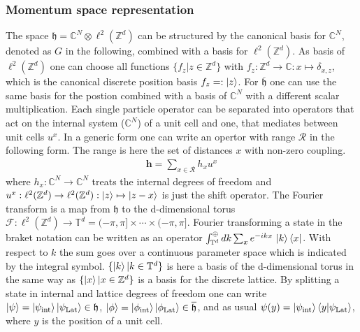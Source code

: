 \subsubsection{Momentum space representation}
The space $\mathfrak{h} = \mathbb{C}^N \otimes \ell^2(\mathbb{Z}^d)$ can be structured by the canonical basis for $\mathbb{C}^N$, denoted as $G$ in the following, combined with a basis for $\ell^2(\mathbb{Z}^d)$. As basis of $\ell^2(\mathbb{Z}^d)$ one can choose all functions $\{f_z|z\in\mathbb{Z}^d\}$ with $f_z: \mathbb{Z}^d\to \mathbb{C}: x\mapsto \delta_{x,z}$, which is the canonical discrete position basis $f_z=:\ket{z}$. For $\overline{\mathfrak{h}}$ one can use the same basis for the postion combined with a basis of $\mathbb{C}^N$ with a different scalar multiplication.
Each single particle operator can be separated into operators that act on the internal system ($\mathbb{C}^N$) of a unit cell and one, that mediates between unit cells $u^x$. In a generic form one can write an opertor with range $\mathcal{R}$ in the following form. The range is here the set of distances $x$ with non-zero coupling.
\begin{align*}
    \mathbf{h}=\sum_{x\in \mathcal{R}} h_x u^x
\end{align*}
where $h_x:\mathbb{C}^N\to\mathbb{C}^N$ treats the internal degrees of freedom and $u^x:\ell^2(\mathbb{Z}^d)\to\ell^2(\mathbb{Z}^d):\ket{z}\mapsto\ket{z-x}$ is just the shift operator. The Fourier transform is a map from $\mathfrak{h}$ to the d-dimensional torus $\mathcal{F}:\ell^2(\mathbb{Z}^d)\to\mathbb{T}^d=(-\pi,\pi]\times\cdots\times(-\pi,\pi]$.
Fourier transforming a state in the braket notation can be written as an operator $\int_{\mathbb{T}^d}^\oplus dk\sum_xe^{-ikx}\, \ket{k}\bra{x}$. With respect to $k$ the sum goes over a continuous parameter space which is indicated by the integral symbol. $\{\ket{k}|k\in\mathbb{T}^d\}$ is here a basis of the d-dimensional torus in the same way as $\{\ket{x}|x\in\mathbb{Z}^d\}$ is a basis for the discrete lattice. By splitting a state in internal and lattice degrees of freedom one can write $\ket{\psi}=\ket{\psi_\text{int}}\ket{\psi_\text{Lat}}\in\mathfrak{h}$, $\ket{\phi}=\ket{\phi_\text{int}}\ket{\phi_\text{Lat}}\in\overline{\mathfrak{h}}$, and as usual $\psi(y)=\ket{\psi_\text{int}}\braket{y|\psi_\text{Lat}}$, where $y$ is the position of a unit cell.
